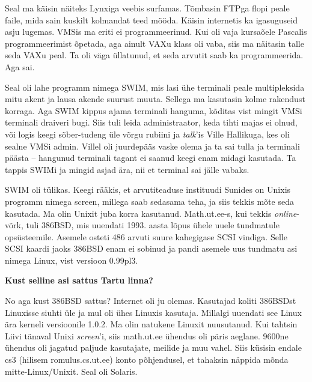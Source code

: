 Seal ma käisin näiteks Lynxiga veebis surfamas. Tõmbasin FTPga flopi peale faile,
mida sain kuskilt kolmandat teed mööda. Käisin internetis
ka igasuguseid asju lugemas. VMSis ma eriti ei programmeerinud. Kui oli vaja
kursaõele Pascalis programmeerimist õpetada, aga ainult VAXu klass oli vaba,
siis ma näitasin talle seda VAXu peal. Ta oli väga
üllatunud, et seda arvutit saab ka programmeerida. Aga sai.

Seal oli lahe programm nimega SWIM, mis lasi ühe terminali peale multipleksida
mitu akent ja lausa akende suurust muuta. Sellega ma kasutasin kolme
rakendust korraga. Aga SWIM kippus ajama terminali hanguma, kõditas vist mingit
VMSi terminali draiveri bugi. Siis tuli leida administraator,
keda tihti majas ei olnud, või logis keegi sõber-tudeng üle võrgu
rubiini ja \emph{talk}'is Ville
Hallikuga, kes oli sealne VMSi admin. Villel oli
juurdepääs vaske olema ja ta sai tulla ja terminali päästa -- hangunud terminali
tagant ei saanud keegi enam midagi kasutada. Ta tappis SWIMi ja mingid asjad ära, nii et terminal sai jälle vabaks. 

SWIM oli tülikas. Keegi rääkis,
et arvutiteaduse instituudi Sunides on Unixis programm nimega screen, millega saab
sedasama teha, ja siis tekkis mõte seda kasutada. Ma olin Unixit juba
korra kasutanud. Math.ut.ee-s, kui tekkis \emph{online}-võrk, tuli 386BSD, mis uuendati 1993. aasta lõpus ühele
uuele tundmatule opsüsteemile. Asemele osteti 486 arvuti suure
kahegigase SCSI vindiga. Selle SCSI kaardi
jaoks 386BSD enam ei sobinud ja pandi asemele uus tundmatu asi nimega
Linux, vist versioon 0.99pl3.

\textbf{Kust selline asi sattus Tartu linna?}

No aga kust 386BSD sattus? Internet oli ju olemas. Kasutajad koliti 386BSDst
Linuxisse siuhti üle ja mul oli ühes Linuxis kasutaja. Millalgi
uuendati see Linux ära kerneli versioonile 1.0.2. Ma olin natukene Linuxit nuusutanud. Kui tahtsin Liivi tänaval Unixi \emph{screen}'i, siis math.ut.ee
ühendus oli päris aeglane. 9600ne ühendus oli jagatud paljude kasutajate, meilide ja muu
vahel. Siis küsisin endale cs3 (hilisem
romulus.cs.ut.ee) konto põhjendusel, et
tahaksin näppida mõnda mitte-Linux/Unixit. Seal oli Solaris.

